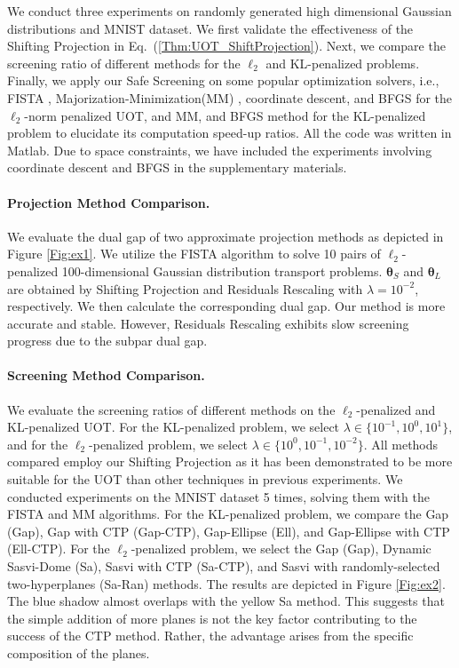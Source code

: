 \documentclass[11pt]{article}
\renewcommand{\vec}[1]{\bm{#1}}
\begin{document}
\label{sec:exp}
We conduct three experiments on randomly generated high dimensional Gaussian distributions and MNIST dataset. We first validate the effectiveness of the Shifting Projection in Eq.~(\ref{Thm:UOT_ShiftProjection}). Next, we compare the screening ratio of different methods for the $\ell_2$ and KL-penalized problems. Finally, we apply our Safe Screening on some popular optimization solvers, i.e., FISTA \cite{Beck_2009_SIAMIS}, Majorization-Minimization(MM) \cite{Chapel_NeurIPS_2021}, coordinate descent, and BFGS for the $\ell_2$-norm penalized UOT, and MM, and BFGS method for the KL-penalized problem to elucidate its computation speed-up ratios. All the code was written in Matlab. Due to space constraints, we have included the experiments involving coordinate descent and BFGS in the supplementary materials.

\paragraph{Projection Method Comparison.}
\label{Sec:EX1}
We evaluate the dual gap of two approximate projection methods as depicted in Figure \ref{Fig:ex1}. We utilize the FISTA algorithm to solve 10 pairs of $\ell_2$-penalized 100-dimensional Gaussian distribution transport problems. $\vec\theta_S$ and $\vec\theta_L$ are obtained by Shifting Projection and Residuals Rescaling with $\lambda = 10^{-2}$, respectively. We then calculate the corresponding dual gap. Our method is more accurate and stable. However, Residuals Rescaling exhibits slow screening progress due to the subpar dual gap.

\paragraph{Screening Method Comparison.}
\label{Sec:EX2}
We evaluate the screening ratios of different methods on the $\ell_2$-penalized and KL-penalized UOT. For the KL-penalized problem, we select $\lambda \in \{10^{-1}, 10^{0}, 10^{1}\}$, and for the $\ell_2$-penalized problem, we select $\lambda \in \{10^{0}, 10^{-1}, 10^{-2}\}$. All methods compared employ our Shifting Projection as it has been demonstrated to be more suitable for the UOT than other techniques in previous experiments. We conducted experiments on the MNIST dataset 5 times, solving them with the FISTA and MM algorithms. For the KL-penalized problem, we compare the Gap (Gap), Gap with CTP (Gap-CTP), Gap-Ellipse (Ell), and Gap-Ellipse with CTP (Ell-CTP). For the $\ell_2$-penalized problem, we select the Gap (Gap), Dynamic Sasvi-Dome (Sa), Sasvi with CTP (Sa-CTP), and Sasvi with randomly-selected two-hyperplanes (Sa-Ran) methods. The results are depicted in Figure \ref{Fig:ex2}. The blue shadow almost overlaps with the yellow Sa method. This suggests that the simple addition of more planes is not the key factor contributing to the success of the CTP method. Rather, the advantage arises from the specific composition of the planes.
\end{document}
